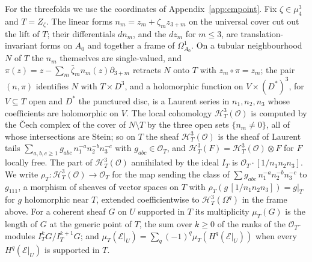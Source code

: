 \documentclass[11pt,reqno]{amsart}
\numberwithin{equation}{section}
\theoremstyle{plain}
\theoremstyle{definition}
\begin{document}
For the threefolds we use the coordinates of Appendix~\ref{app:cmpoint}. Fix $\zeta\in\mu_{4}^{3}$ and $T=Z_{\zeta}$. The linear forms $n_{m}=z_{m}+\zeta_{m}z_{3+m}$ on the universal cover cut out the lift of $T$; their differentials $dn_{m}$, and the $dz_{m}$ for $m\le3$, are translation-invariant forms on $A_{0}$ and together a frame of $\Omega^{1}_{A_{0}}$. On a tubular neighbourhood $N$ of $T$ the $n_{m}$ themselves are single-valued, and $\pi(z)=z-\sum_{m}\bar\zeta_{m}n_{m}(z)\partial_{3+m}$ retracts $N$ onto $T$ with $z_{m}\circ\pi=z_{m}$; the pair $(n,\pi)$ identifies $N$ with $T\times D^{3}$, and a holomorphic function on $V\times(D^{*})^{3}$, for $V\subseteq T$ open and $D^{*}$ the punctured disc, is a Laurent series in $n_{1},n_{2},n_{3}$ whose coefficients are holomorphic on $V$. The local cohomology $\mathcal{H}^{3}_{T}(\mathcal{O})$ is computed by the \v{C}ech complex of the cover of $N\setminus T$ by the three open sets $\{n_{m}\ne0\}$, all of whose intersections are Stein; so on $T$ the sheaf $\mathcal{H}^{3}_{T}(\mathcal{O})$ is the sheaf of Laurent tails $\sum_{a,b,c\ge1}g_{abc}\,n_{1}^{-a}n_{2}^{-b}n_{3}^{-c}$ with $g_{abc}\in\mathcal{O}_{T}$, and $\mathcal{H}^{3}_{T}(F)=\mathcal{H}^{3}_{T}(\mathcal{O})\otimes F$ for $F$ locally free. The part of $\mathcal{H}^{3}_{T}(\mathcal{O})$ annihilated by the ideal $I_{T}$ is $\mathcal{O}_{T}\cdot[1/n_{1}n_{2}n_{3}]$. We write $\rho_{T}\colon\mathcal{H}^{3}_{T}(\mathcal{O})\to\mathcal{O}_{T}$ for the map sending the class of $\sum g_{abc}\,n_{1}^{-a}n_{2}^{-b}n_{3}^{-c}$ to $g_{111}$, a morphism of sheaves of vector spaces on $T$ with $\rho_{T}(g\,[1/n_{1}n_{2}n_{3}])=g|_{T}$ for $g$ holomorphic near $T$, extended coefficientwise to $\mathcal{H}^{3}_{T}(\Omega^{q})$ in the frame above. For a coherent sheaf $G$ on $U$ supported in $T$ its multiplicity $\mu_{T}(G)$ is the length of $G$ at the generic point of $T$, the sum over $k\ge0$ of the ranks of the $\mathcal{O}_{T}$-modules $I_{T}^{k}G/I_{T}^{k+1}G$; and $\mu_{T}(\mathcal{E}|_{U})=\sum_{q}(-1)^{q}\mu_{T}(H^{q}(\mathcal{E}|_{U}))$ when every $H^{q}(\mathcal{E}|_{U})$ is supported in $T$.
\end{document}
